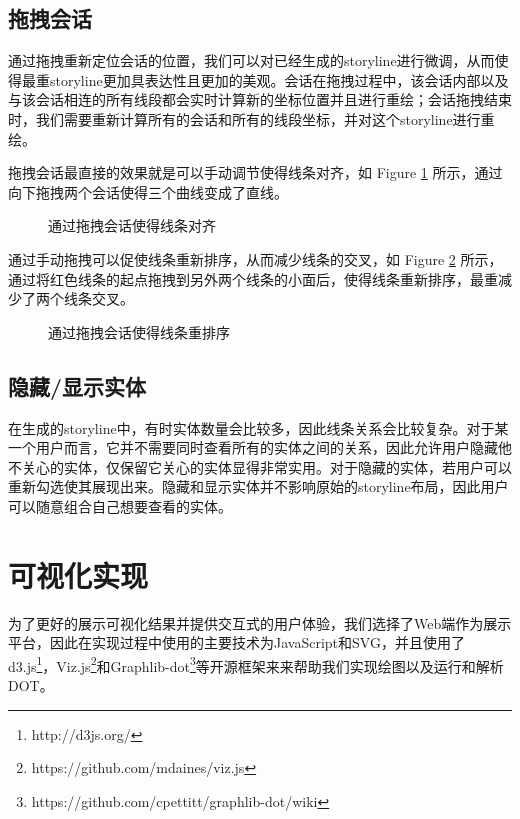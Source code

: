 \subsection{拖拽会话}
通过拖拽重新定位会话的位置，我们可以对已经生成的storyline进行微调，从而使得最重storyline更加具表达性且更加的美观。会话在拖拽过程中，该会话内部以及与该会话相连的所有线段都会实时计算新的坐标位置并且进行重绘；会话拖拽结束时，我们需要重新计算所有的会话和所有的线段坐标，并对这个storyline进行重绘。

拖拽会话最直接的效果就是可以手动调节使得线条对齐，如 Figure \ref{fig:drag-to-realignment} 所示，通过向下拖拽两个会话使得三个曲线变成了直线。
\begin{figure}[htb]
	\centering
	\caption{通过拖拽会话使得线条对齐}
	\label{fig:drag-to-realignment}
\end{figure}

通过手动拖拽可以促使线条重新排序，从而减少线条的交叉，如 Figure \ref{fig:drag-to-reorder} 所示，通过将红色线条的起点拖拽到另外两个线条的小面后，使得线条重新排序，最重减少了两个线条交叉。
\begin{figure}[htb]
	\centering
	\caption{通过拖拽会话使得线条重排序}
	\label{fig:drag-to-reorder}
\end{figure}

\subsection{隐藏/显示实体}
在生成的storyline中，有时实体数量会比较多，因此线条关系会比较复杂。对于某一个用户而言，它并不需要同时查看所有的实体之间的关系，因此允许用户隐藏他不关心的实体，仅保留它关心的实体显得非常实用。对于隐藏的实体，若用户可以重新勾选使其展现出来。隐藏和显示实体并不影响原始的storyline布局，因此用户可以随意组合自己想要查看的实体。

\section{可视化实现}
为了更好的展示可视化结果并提供交互式的用户体验，我们选择了Web端作为展示平台，因此在实现过程中使用的主要技术为JavaScript和SVG，并且使用了d3.js\footnote{http://d3js.org/}，Viz.js\footnote{https://github.com/mdaines/viz.js}和Graphlib-dot\footnote{https://github.com/cpettitt/graphlib-dot/wiki}等开源框架来来帮助我们实现绘图以及运行和解析DOT。
